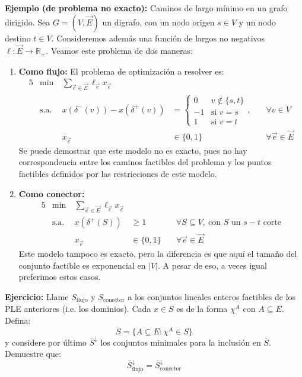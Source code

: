 \documentclass[10pt]{article}
\newcommand{\R}{\mathbb R}
\theoremstyle{plain}
\theoremstyle{definition}
\begin{document}
\textbf{Ejemplo (de problema no exacto):} Caminos de largo mínimo en un grafo dirigido. Sea $G = (V, \vec{E})$ un digrafo, con un nodo origen $s \in V$ y un nodo destino $t \in V$. Consideremos además una función de largos no negativos $\ell: \vec{E} \to \R_+$.  Veamos este problema de dos maneras:
\begin{enumerate}
\item \textbf{Como flujo:} El problema de optimización a resolver es:
\begin{alignat*}{5}
&\min\        & \sum_{\vec{e} \in \vec{E}} \ell_{\vec{e}} x_{\vec{e}} \\
&\text{s.a. } & x(\delta^-(v))-x(\delta^+(v))&= \begin{cases}0 & v \not \in  \{s,t\}\\ -1 & \mbox{si } v=s\\1 & \mbox{si } v=t \end{cases}, &  \quad\forall v \in V\\
&                  & x_{\vec{e}}                      &\in \{0,1\} &\quad\forall \vec{e} \in \vec{E} 
\end{alignat*}
Se puede demostrar que este modelo no es exacto, pues no hay correspondencia entre los caminos factibles del problema y los puntos factibles definidos por las restricciones de este modelo.

\item \textbf{Como conector:} 
\begin{alignat*}{5}
&\min\        & \sum_{\vec{e} \in \vec{E}} \ell_{\vec{e}} x_{\vec{e}} \\
&\text{s.a. } & x(\delta^+(S))&\geq 1&  \quad\forall S \subseteq V,\ \text{con $S$ un $s-t$ corte}\\
&                  & x_{\vec{e}}                      &\in \{0,1\} &\quad\forall \vec{e} \in \vec{E} 
\end{alignat*}
Este modelo tampoco es exacto, pero la diferencia es que aquí el tamaño del conjunto factible es exponencial en $|V|$. A pesar de eso, a veces igual preferimos estos casos.\\
\end{enumerate}
\textbf{Ejercicio:} Llame $S_{\text{flujo}}$ y $S_{\text{conector}}$ a los conjuntos lineales enteros factibles de los PLE anteriores (i.e. los dominios). Cada $x \in S$ es de la forma $\chi^A$ con $A \subseteq E$. Defina:
$$
\overline{S} = \{A \subseteq E: \chi^A \in S\}
$$
y considere por último $\overline{S}^{\downarrow}$ los conjuntos minimales para la inclusión en $\overline{S}$. Demuestre que:
$$
\overline{S}^{\downarrow}_{\text{flujo}} = \overline{S}^{\downarrow}_{\text{conector}}
$$
\newpage
\end{document}
